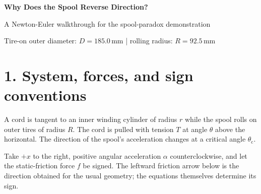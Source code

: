 \documentclass[11pt]{article}
\begin{document}
\begin{center}
  {\color{navy}\LARGE\bfseries Why Does the Spool Reverse Direction?}\par
  \vspace{3pt}
  {\large A Newton-Euler walkthrough for the spool-paradox demonstration}\par
  \vspace{5pt}
  {\color{darkgray}\small Tire-on outer diameter: $D=185.0\,\mathrm{mm}$ \quad | \quad rolling radius: $R=92.5\,\mathrm{mm}$}
\end{center}

\section*{1. System, forces, and sign conventions}

A cord is tangent to an inner winding cylinder of radius $r$ while the spool rolls on outer tires of radius $R$. The cord is pulled with tension $T$ at angle $\theta$ above the horizontal. The direction of the spool's acceleration changes at a critical angle $\theta_{\mathrm c}$.

Take $+x$ to the right, positive angular acceleration $\alpha$ counterclockwise, and let the static-friction force $f$ be signed. The leftward friction arrow below is the direction obtained for the usual geometry; the equations themselves determine its sign.
\end{document}
